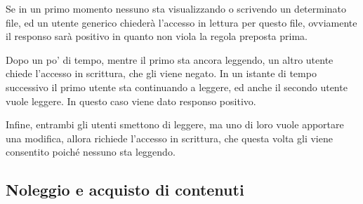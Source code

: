 Se in un primo momento nessuno sta visualizzando o scrivendo un determinato file, ed un utente generico 
chiederà l'accesso in lettura per questo file, ovviamente il responso sarà positivo in quanto non viola la regola preposta prima.\par
Dopo un po' di tempo, mentre il primo sta ancora leggendo, un altro utente chiede l'accesso in scrittura, che gli viene negato.
In un istante di tempo successivo il primo utente sta continuando a leggere, ed anche il secondo utente vuole leggere. In questo caso viene dato responso positivo.\par
Infine, entrambi gli utenti smettono di leggere, ma uno di loro vuole apportare una modifica, allora richiede l'accesso in scrittura, che questa volta gli viene consentito poiché nessuno sta leggendo.



\subsection{Noleggio e acquisto di contenuti}
\label{sub:case2}

